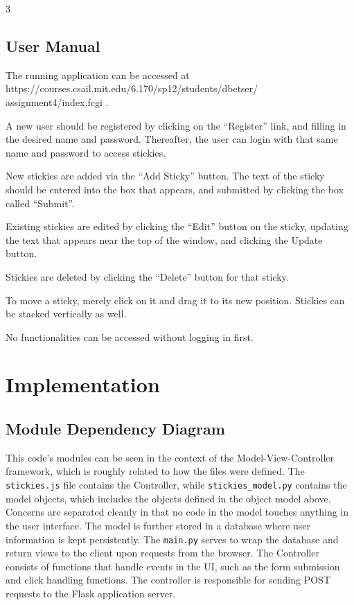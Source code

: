 3\documentclass[11pt,letterpaper]{article}
\begin{document}
\subsection{User Manual}
The running application can be accessed at https://courses.csail.mit.edu/6.170/sp12/students/dbetser/
assignment4/index.fcgi .

A new user should be registered by clicking on the ``Register'' link, and filling in the desired name and password. Thereafter, the user can login with that same name and password to access stickies.

New stickies are added via the ``Add Sticky'' button. The text of the sticky should be entered into the box that appears, and submitted by clicking the box called ``Submit''.

Existing stickies are edited by clicking the ``Edit'' button on the sticky, updating the text that appears near the top of the window, and clicking the Update button.

Stickies are deleted by clicking the ``Delete'' button for that sticky.

To move a sticky, merely click on it and drag it to its new position. Stickies can be stacked vertically as well.

No functionalities can be accessed without logging in first.

\section{Implementation}

\subsection{Module Dependency Diagram}
This code's modules can be seen in the context of the Model-View-Controller framework, which is roughly related to how the files were defined. The \texttt{stickies.js} file contains the Controller, while \texttt{stickies\_model.py} contains the model objects, which includes the objects defined in the object model above. Concerns are separated cleanly in that no code in the model touches anything in the user interface. The model is further stored in a database where user information is kept persistently. The \texttt{main.py} serves to wrap the database and return views to the client upon requests from the browser. The Controller consists of functions that handle events in the UI, such as the form submission and click handling functions. The controller is responsible for sending POST requests to the Flask application server.
\end{document}
